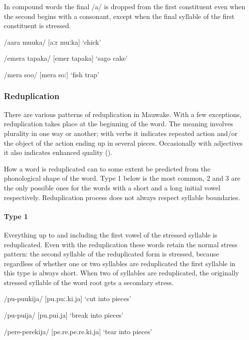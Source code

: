 In compound words the final /a/ is dropped from the first constituent even when the second begins with a consonant, except when the final syllable of the first constituent is stressed.  

/aara muuka/  [{{\textprimstress}aːr {{\textprimstress}}muːka}]  `chick'

/emera tapaka/  [e{{\textprimstress}mer ta{{\textprimstress}}paka}]  `sago cake'

/mera soo/  [me{{\textprimstress}ra {{\textprimstress}}soː}]  `fish trap'

\subsubsection{Reduplication}

There are various patterns of reduplication in Mauwake. With a few exceptions, reduplication takes place at the beginning of the word.  The meaning involves plurality in one way or another; with verbs it indicates repeated action and/or the object of the action ending up in several pieces. Occasionally with adjectives it also indicates enhanced quality ().

How a word is reduplicated can to some extent be predicted from the phonological shape of the word.  Type 1 below is the most common, 2 and 3 are the only possible ones for the words with a short and a long initial vowel respectively.  Reduplication process does not always respect syllable boundaries.

\paragraph[Type 1]{Type 1}

Everything up to and including the first vowel of the stressed syllable is reduplicated.  Even with the reduplication these words retain the normal stress pattern: the second syllable of the reduplicated form is stressed, because regardless of whether one or two syllables are reduplicated the first syllable in this type is always short. When two of syllables are reduplicated, the originally stressed syllable of the word root gets a secondary stress.

/pu-puukija/  [pu.{{\textprimstress}puː.ki.ja}]  `cut into pieces'

/pu-puija/  [pu.{{\textprimstress}pui.ja}]  `break into pieces'

/pere-perekija/  [pe.{{\textprimstress}}re.pe.{{\textprimstress}}{{\textprimstress}}re.ki.ja]  `tear into pieces'

